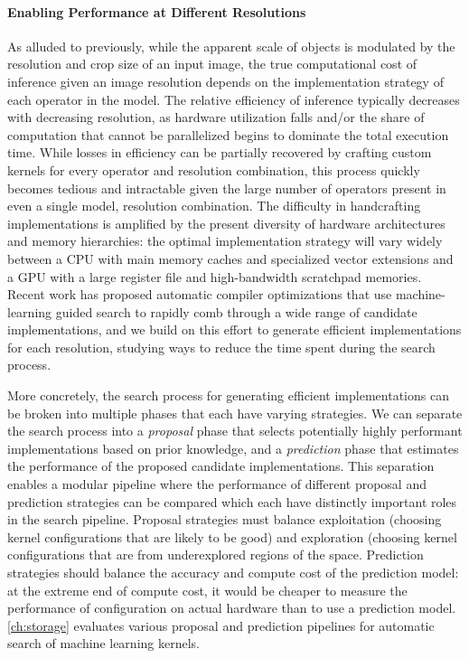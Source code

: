 \paragraph{Enabling Performance at Different Resolutions}
As alluded to previously, while the apparent scale of objects is modulated by the resolution and crop size of an input image, the true computational cost of inference given an image resolution depends on the implementation strategy of each operator in the model.
The relative efficiency of inference typically decreases with decreasing resolution, as hardware utilization falls and/or the share of computation that cannot be parallelized begins to dominate the total execution time.
While losses in efficiency can be partially recovered by crafting custom kernels for every operator and resolution combination, this process quickly becomes tedious and intractable given the large number of operators present in even a single model, resolution combination.
The difficulty in handcrafting implementations is amplified by the present diversity of hardware architectures and memory hierarchies: the optimal implementation strategy will vary widely between a CPU with main memory caches and specialized vector extensions and a GPU with a large register file and high-bandwidth scratchpad memories.
Recent work has proposed automatic compiler optimizations that use machine-learning guided search to rapidly comb through a wide range of candidate implementations, and we build on this effort to generate efficient implementations for each resolution, studying ways to reduce the time spent during the search process.

More concretely, the search process for generating efficient implementations can be broken into multiple phases that each have varying strategies.
We can separate the search process into a \emph{proposal} phase that selects potentially highly performant implementations based on prior knowledge, and a \emph{prediction} phase that estimates the performance of the proposed candidate implementations.
This separation enables a modular pipeline where the performance of different proposal and prediction strategies can be compared which each have distinctly important roles in the search pipeline.
Proposal strategies must balance exploitation (choosing kernel configurations that are likely to be good) and exploration (choosing kernel configurations that are from underexplored regions of the space.
Prediction strategies should balance the accuracy and compute cost of the prediction model: at the extreme end of compute cost, it would be cheaper to measure the performance of configuration on actual hardware than to use a prediction model.
\autoref{ch:storage} evaluates various proposal and prediction pipelines for automatic search of machine learning kernels.


